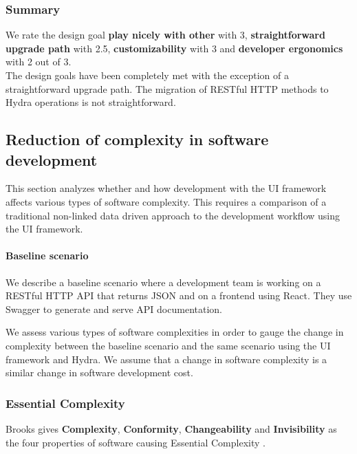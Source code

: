 \subsubsection{Summary}
We rate the design goal \textbf{play nicely with other} with 3, \textbf{straightforward upgrade path} with 2.5, \textbf{customizability} with 3 and \textbf{developer ergonomics} with 2 out of 3. \\ The design goals have been completely met with the exception of a straightforward upgrade path. The migration of RESTful HTTP methods to Hydra operations is not straightforward.

\subsection{Reduction of complexity in software development}
This section analyzes whether and how development with the UI framework affects various types of software complexity. This requires a comparison of a traditional non-linked data driven approach to the development workflow using the UI framework.

\paragraph{Baseline scenario} We describe a baseline scenario where a development team is working on a RESTful HTTP API that returns JSON and on a frontend using React. They use Swagger to generate and serve API documentation.

We assess various types of software complexities in order to gauge the change in complexity between the baseline scenario and the same scenario using the UI framework and Hydra. We assume that a change in software complexity is a similar change in software development cost.

\subsubsection{Essential Complexity}
Brooks gives \textbf{Complexity}, \textbf{Conformity}, \textbf{Changeability} and \textbf{Invisibility} as the four properties of software causing Essential Complexity \citep{nosilverbullet}.

